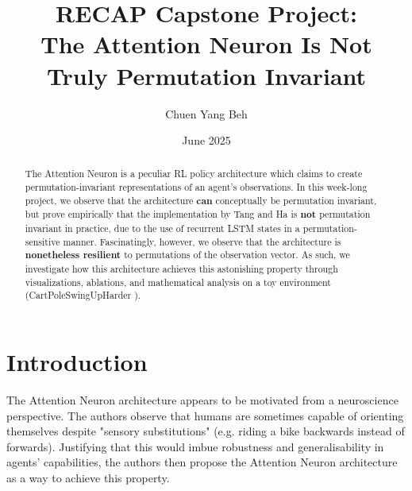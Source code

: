 \documentclass{article}
\begin{document}
\title{RECAP Capstone Project: \\ The Attention Neuron Is Not \\ Truly Permutation Invariant}
\author{Chuen Yang Beh}
\date{June 2025}

\maketitle

\begin{abstract}
The Attention Neuron \cite{Tang-and-Ha-2021} is a peculiar RL policy architecture which claims
to create permutation-invariant representations of an agent's observations. In this week-long project, we observe that the architecture \textbf{can} conceptually be permutation invariant,
but prove empirically that the implementation by Tang and Ha \cite{Tang-and-Ha-2021}
is \textbf{not} permutation invariant in practice, due to the use of recurrent LSTM states
in a permutation-sensitive manner. Fascinatingly, however, we observe that the architecture is \textbf{nonetheless resilient} to permutations of the observation vector.
As such, we investigate how this architecture achieves this astonishing property through 
visualizations, ablations, and mathematical analysis on a toy environment (CartPoleSwingUpHarder \cite{Freeman-et-al-2019}).
\end{abstract}


\section{Introduction}

The Attention Neuron architecture \cite{Tang-and-Ha-2021} appears to be motivated
from a neuroscience perspective. The authors observe that humans are sometimes capable
of orienting themselves despite "sensory substitutions" (e.g. riding a bike backwards instead of forwards).
Justifying that this would imbue robustness and generalisability in agents' capabilities,
the authors then propose the Attention Neuron architecture as a way to achieve this property.
\end{document}
